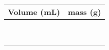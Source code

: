 \documentclass[main.tex]{subfiles}
\begin{document}
\begin{fullwidth}
\begin{center}\begin{tabular}{ |p{3cm}|p{5cm}| }
\hline
    Volume (mL) &  mass (g)        \\
\hline
   \vspace{0cm}\vspace{.5cm} &           \\
\hline
   \vspace{0cm}\vspace{.5cm} &                 \\
\hline
   \vspace{0cm}\vspace{.5cm} &                 \\
\hline
   \vspace{0cm}\vspace{.5cm} &                 \\
\hline
   \vspace{0cm}\vspace{.5cm} &                 \\
\hline
  \vspace{0cm}\vspace{.5cm} &                 \\
\hline
  \vspace{0cm}\vspace{.5cm} &                 \\
\hline
  \vspace{0cm}\vspace{.5cm} &                 \\
\hline
  \vspace{0cm}\vspace{.5cm} &                 \\
\hline
\end{tabular}\end{center}



\end{fullwidth}
\end{document}
